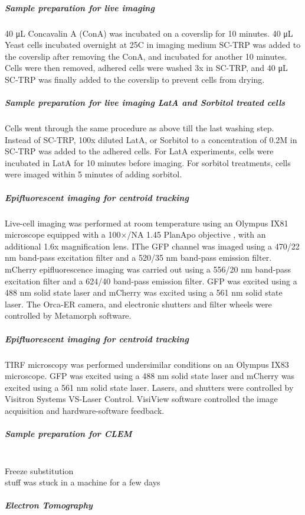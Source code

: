 \subparagraph{Sample preparation for live imaging}
40 μL Concavalin A (ConA) was incubated on a coverslip for 10 minutes. 40 μL Yeast cells incubated overnight at 25C in imaging medium SC-TRP was added to the coverslip after removing the ConA, and incubated for another 10 minutes. Cells were then removed, adhered cells were washed 3x in SC-TRP, and 40 μL SC-TRP was finally added to the coverslip to prevent cells from drying. 

\subparagraph{Sample preparation for live imaging LatA and Sorbitol treated cells}
Cells went through the same procedure as above till the last washing step. Instead of SC-TRP, 100x diluted LatA, or Sorbitol to a concentration of 0.2M in SC-TRP was added to the adhered cells. For LatA experiments, cells were incubated in LatA for 10 minutes before imaging. For sorbitol treatments, cells were imaged within 5 minutes of adding sorbitol.


\subparagraph{Epifluorescent imaging for centroid tracking}
Live-cell imaging was performed at room temperature using an Olympus IX81 microscope equipped with a 100×/NA 1.45 PlanApo objective , with an additional 1.6x magnification lens. IThe GFP channel was imaged using a 470/22 nm band-pass excitation filter and a 520/35 nm band-pass emission filter. mCherry epifluorescence imaging was carried out using a 556/20 nm band-pass excitation filter and a 624/40 band-pass emission filter. GFP was excited using a 488 nm solid state laser and mCherry was excited using a 561 nm solid state laser. The Orca-ER camera, and electronic shutters and filter wheels were controlled by Metamorph software.

\subparagraph{Epifluorescent imaging for centroid tracking}
TIRF microscopy was performed undersimilar conditions on an Olympus IX83 microscope. GFP was excited using a 488 nm solid state laser and mCherry was excited using a 561 nm solid state laser. Lasers, and shutters were controlled by Visitron Systems VS-Laser Control.  VisiView software controlled the image acquisition and hardware-software feedback.

\subparagraph{Sample preparation for CLEM}
			\mbox{}\\
\subsubitem
Freeze substitution
			\mbox{}\\
			stuff was stuck in a machine for a few days

\subparagraph{Electron Tomography}


